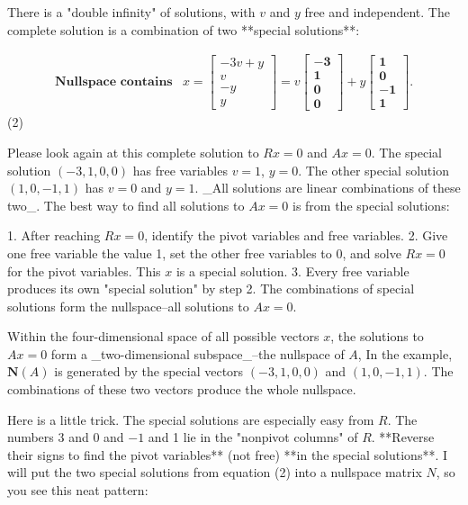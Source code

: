 There is a "double infinity" of solutions, with \(v\) and \(y\) free and independent. The complete solution is a combination of two **special solutions**:

\[\begin{array}{ll}\textbf{Nullspace contains}&x=\begin{bmatrix}-3v+y\\ v\\ -y\\ y\end{bmatrix}=v\begin{bmatrix}-\textbf{3}\\ \textbf{1}\\ \textbf{0}\\ \textbf{0}\end{bmatrix}+y\begin{bmatrix}\textbf{1}\\ \textbf{0}\\ -\textbf{1}\\ \textbf{1}\end{bmatrix}.\end{array}\] (2)

Please look again at this complete solution to \(Rx=0\) and \(Ax=0\). The special solution \((-3,1,0,0)\) has free variables \(v=1\), \(y=0\). The other special solution \((1,0,-1,1)\) has \(v=0\) and \(y=1\). _All solutions are linear combinations of these two_. The best way to find all solutions to \(Ax=0\) is from the special solutions:

1. After reaching \(Rx=0\), identify the pivot variables and free variables.
2. Give one free variable the value 1, set the other free variables to 0, and solve \(Rx=0\) for the pivot variables. This \(x\) is a special solution.
3. Every free variable produces its own "special solution" by step 2. The combinations of special solutions form the nullspace--all solutions to \(Ax=0\).

Within the four-dimensional space of all possible vectors \(x\), the solutions to \(Ax=0\) form a _two-dimensional subspace_--the nullspace of \(A\), In the example, \(\boldsymbol{N}(A)\) is generated by the special vectors \((-3,1,0,0)\) and \((1,0,-1,1)\). The combinations of these two vectors produce the whole nullspace.

Here is a little trick. The special solutions are especially easy from \(R\). The numbers 3 and 0 and \(-1\) and 1 lie in the "nonpivot columns" of \(R\). **Reverse their signs to find the pivot variables** (not free) **in the special solutions**. I will put the two special solutions from equation (2) into a nullspace matrix \(N\), so you see this neat pattern:

